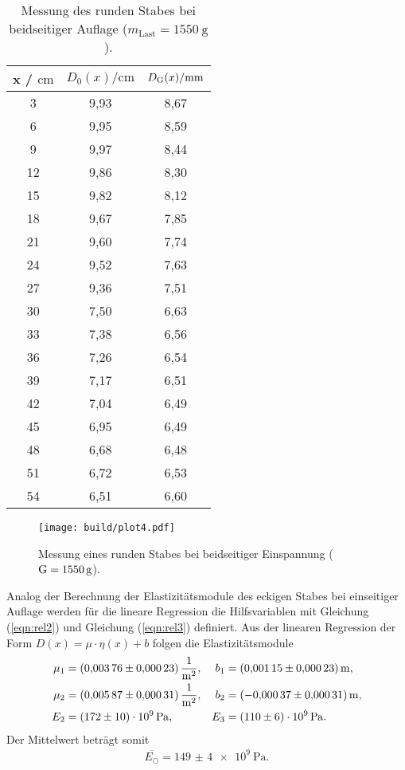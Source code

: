 \sloppy
\begin{table}[H]
  \centering
  \caption{Messung des runden Stabes bei beidseitiger Auflage ($m_{\text{Last}} = \SI{1550}{\gram}$).}
  \label{tab:werte4}
  \begin{tabular}{c c c}
    \toprule
    x / $\si{\centi\meter} $ & $ D_0(x) / \si{\centi\meter}$ & $D_{\text G}(x) / \si{\milli\meter}$ \\
    \midrule
    3 & 9,93 & 8,67 \\
    6 & 9,95 & 8,59 \\
    9 & 9,97 & 8,44 \\
    12 & 9,86 & 8,30 \\
    15 & 9,82 & 8,12 \\
    18 & 9,67 & 7,85 \\
    21 & 9,60 & 7,74 \\
    24 & 9,52 & 7,63 \\
    27 & 9,36 & 7,51 \\
    30 & 7,50 & 6,63 \\
    33 & 7,38 & 6,56 \\
    36 & 7,26 & 6,54 \\
    39 & 7,17 & 6,51 \\
    42 & 7,04 & 6,49 \\
    45 & 6,95 & 6,49 \\
    48 & 6,68 & 6,48 \\
    51 & 6,72 & 6,53 \\
    54 & 6,51 & 6,60 \\
    \bottomrule
  \end{tabular}
\end{table}

\sloppy
\begin{figure}[H]
  \centering
  \texttt{[image: build/plot4.pdf]}
  \caption{Messung eines runden Stabes bei beidseitiger Einspannung ($\text G = \SI{1550}{\gram}$).}
  \label{fig:plot4}
\end{figure}


Analog der Berechnung der Elastizitätsmodule des eckigen Stabes bei einseitiger Auflage werden für die lineare Regression die 
Hilfsvariablen mit Gleichung (\ref{eqn:rel2}) und Gleichung (\ref{eqn:rel3}) definiert. Aus der linearen Regression der Form $D(x) = \mu\cdot\eta(x)+b$
folgen die Elastizitätsmodule
\begin{align*}
  \mu_1 &= \SI{0.00376 (0.00023)}{\per\square\meter}, & b_1 &= \SI{0.00115(0.00023)}{\meter}, \\
  \mu_2 &= \SI{0.00587 (0.00031)}{\per\square\meter}, & b_2 &= \SI{-0.00037 (0.00031)}{\meter}, \\
  E_2 &= \SI{172 (10)e9}{\Pa}, & E_3 &= \SI{110 (6)e9}{\Pa}.\\
\end{align*}
Der Mittelwert beträgt somit
\begin{align*}
  \overline{E_{\bigcirc}} = \SI{149(4)e9}{\Pa}.
\end{align*}